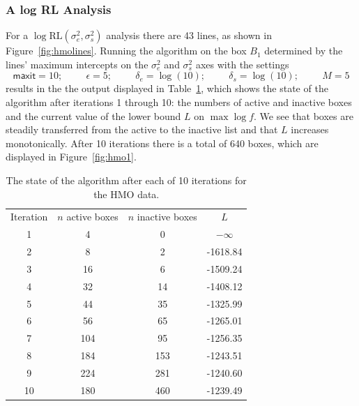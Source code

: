 \documentclass{report}
\newcommand{\textcompute}{\textsf}
\newcommand{\RLorig}{\text{RL}}
\newcommand{\logRLorig}{\log\RLorig}
\newcommand{\sigssq}{\sigma_s^2}
\newcommand{\sigesq}{\sigma_e^2}
\newcommand{\logRLssorig}{\logRLorig(\sigesq,\sigssq)}
\newcommand{\maxit}{\textcompute{maxit}}
\begin{document}
\subsubsection{A log RL Analysis}
For a $\logRLssorig$ analysis there are 43 lines, as shown in Figure~\ref{fig:hmolines}.
Running the algorithm on the box $B_1$ determined by the lines' maximum intercepts on the $\sigesq$ and $\sigssq$ axes with the settings
\begin{equation*}
	\maxit=10; \hspace{1cm} \epsilon=5; \hspace{1cm}
	\delta_e=\log(10); \hspace{1cm} \delta_s=\log(10); \hspace{1cm} M=5
\end{equation*}
results in the the output displayed in Table~\ref{table:hmo_HH11_run}, which shows the state of the algorithm after iterations 1 through 10: the numbers of active and inactive boxes and the current value of the lower bound $L$ on $\max\log f$.  We see that boxes are steadily transferred from the active to the inactive list and that $L$ increases monotonically.  After 10 iterations there is a total of 640 boxes, which are displayed in Figure~\ref{fig:hmo1}.

\begin{table}[h]
\centering
\begin{tabular}{|c|c|c|c|}
\hline
Iteration & $n$ active boxes & $n$ inactive boxes & $L$\\
1 & 4 & 0 & $-\infty$\\
2 & 8 & 2 & -1618.84\\
3 & 16 & 6 & -1509.24\\
4 & 32 & 14 & -1408.12\\
5 & 44 & 35 & -1325.99\\
6 & 56 & 65 & -1265.01\\
7 & 104 & 95 & -1256.35\\
8 & 184 & 153 & -1243.51\\
9 & 224 & 281 & -1240.60\\
10 & 180 & 460 & -1239.49\\
\hline
\end{tabular}
\caption{The state of the algorithm after each of 10 iterations for the HMO data.}
\label{table:hmo_HH11_run}
\end{table}
\end{document}
